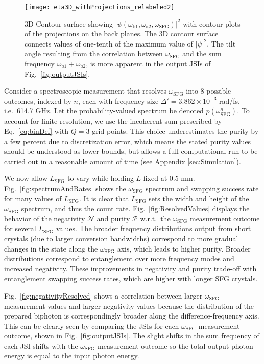 \documentclass[twocolumn,amssymb, nobibnotes, showpacs, aps, pra,10pt]{revtex4-1}
\newcommand*{\watwo}{\omega_{\textrm{a}2}}
\newcommand*{\wbone}{\omega_{\textrm{b}1}}
\newcommand*{\wbtwo}{\omega_{\textrm{b}2}}
\newcommand*{\wsfg}{\omega_\textrm{SFG}}
\begin{document}
\begin{figure*}[htb]
\begin{center}
\texttt{[image: eta3D\_withProjections\_relabeled2]}
\caption{3D Contour surface showing $|\psi(\wbone,\watwo,\wsfg)|^2$ with contour plots of the projections on the back planes. The 3D contour surface connects values of one-tenth of the maximum value of $|\psi|^2$. The tilt angle resulting from the correlation between $\wsfg$ and the sum frequency $\wbone+\wbtwo$, is more apparent in the output JSIs of Fig.\ \ref{fig:outputJSIs}.}
\label{fig:eta}
\end{center}
\end{figure*}

Consider a spectroscopic measurement that resolves $\wsfg$ into 8 possible outcomes, indexed by $n$, each with frequency size $\Delta' = 3.862\times 10^{-3}$ rad/fs, i.e.\ 614.7 GHz. Let the probability-valued spectrum be denoted $p(\omega_{\text{SFG}}^n)$. To account for finite resolution, we use the incoherent sum prescribed by Eq.\ \eqref{eq:binDef} with $Q=3$ grid points. This choice underestimates the purity by a few percent due to discretization error, which means the stated purity values should be understood as lower bounds, but allows a full computational run to be carried out in a reasonable amount of time (see Appendix \ref{sec:Simulation}).

We now allow $L_{\text{SFG}}$ to vary while holding $L$ fixed at 0.5 mm. Fig.\ \ref{fig:spectrumAndRates} shows the $\wsfg$ spectrum and swapping success rate for many values of $L_{\text{SFG}}$. It is clear that $L_{\text{SFG}}$ sets the width and height of the $\wsfg$ spectrum, and thus the count rate. Fig.\ \ref{fig:ResolvedValues} displays the behavior of the negativity $\mathcal{N}$ and purity $\mathcal{P}$ w.r.t.\ the $\wsfg$ measurement outcome for several $L_{\text{SFG}}$ values. The broader frequency distributions output from short crystals (due to larger conversion bandwidths) correspond to more gradual changes in the state along the $\wsfg$ axis, which leads to higher purity. Broader distributions correspond to entanglement over more frequency modes and increased negativity. These improvements in negativity and purity trade-off with entanglement swapping success rates, which are higher with longer SFG crystals.

Fig.\ \ref{fig:negativityResolved} shows a correlation between larger $\wsfg$ measurement values and larger negativity values because the distribution of the prepared biphoton is correspondingly broader along the difference-frequency axis. This can be clearly seen by comparing the JSIs for each $\wsfg$ measurement outcome, shown in Fig.\ \ref{fig:outputJSIs}. The slight shifts in the sum frequency of each JSI shifts with the $\wsfg$ measurement outcome so the total output photon energy is equal to the input photon energy.
\end{document}

